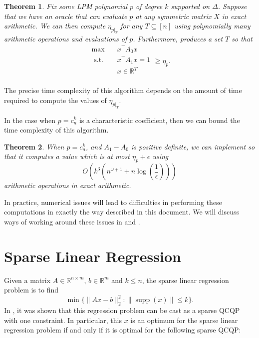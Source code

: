 \documentclass{amsart}
\newtheorem{theorem}{Theorem}[section]
\theoremstyle{definition}
\newcommand{\R}{\mathbb{R}}
\DeclareMathOperator*{\supp}{supp}
\newcommand{\st}{{\text{ s.t. }}}
\begin{document}
\begin{theorem}
    \label{thm:greedy_works}
    Fix some LPM polynomial $p$ of degree $k$ supported on $\Delta$.
    Suppose that we have an oracle that can evaluate $p$ at any symmetric matrix $X$ in exact arithmetic.
    We can then compute $\eta_{p|_{T}}$ for any $T \subseteq [n]$ using polynomially many arithmetic operations and evaluations of $p$.
    Furthermore,  produces a set $T$ so that
    \begin{equation}
        \begin{aligned}
            \max\quad & x^{\intercal}A_0x\\
            \st & x^{\intercal}A_1x = 1\\
                & x \in \R^T\\
        \end{aligned}
        \ge \eta_p.
    \end{equation}
\end{theorem}
The precise time complexity of this algorithm depends on the amount of time required to compute the values of $\eta_{p|_T}$.

In the case when $p = c_n^k$ is a characteristic coefficient, then we can bound the time complexity of this algorithm.
\begin{theorem}
    \label{thm:characteristic}
    When $p = c_n^k$, and $A_1 - A_0$ is positive definite, we can implement  so that it computes a value which is at most $\eta_p + \epsilon$ using
    \[
        O(k^3(n^{\omega+1} + n\log(\frac{1}{\epsilon})))
    \]
    arithmetic operations in exact arithmetic.
\end{theorem}

In practice, numerical issues will lead to difficulties in performing these computations in exactly the way described in this document. We will discuss ways of working around these issues in  and .



\section{Sparse Linear Regression}
\label{sec:sparseReg}
Given a matrix $A \in \R^{n \times m}$, $b \in \R^m$ and $k \le n$, the sparse linear regression problem is to find
\[
    \min \{ \|A x - b\|_2^2 : \|\supp(x)\| \le k\}.
\]
In \cite{ben2022new}, it was shown that this regression problem can be cast as a sparse QCQP with one constraint. In particular, this $x$ is an optimum for the sparse linear regression problem if and only if it is optimal for the following sparse QCQP:
\end{document}
